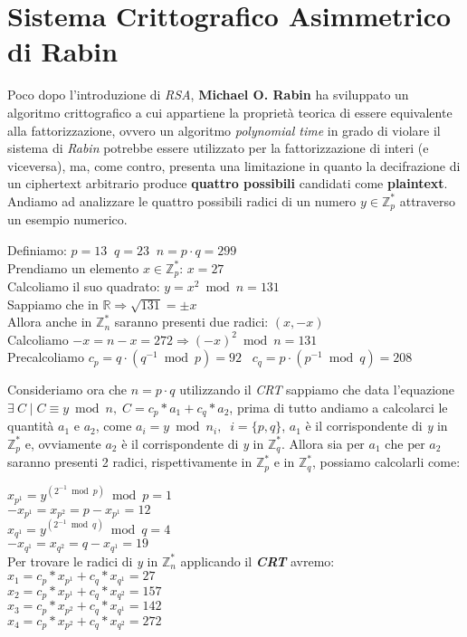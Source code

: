 \section{Sistema Crittografico Asimmetrico di Rabin}
Poco dopo l'introduzione di \textit{RSA}, \textbf{Michael O. Rabin} ha sviluppato un algoritmo crittografico a cui appartiene la proprietà teorica di essere equivalente alla fattorizzazione, ovvero un algoritmo \textit{polynomial time} in grado di violare il sistema di \textit{Rabin} potrebbe essere utilizzato per la fattorizzazione di interi (e viceversa), ma, come contro, presenta una limitazione in quanto la decifrazione di un ciphertext arbitrario produce \textbf{quattro possibili} candidati come \textbf{plaintext}. Andiamo ad analizzare le quattro possibili radici di un numero $y \in \mathbb{Z}_p^*$ attraverso un esempio numerico.
\begin{center}
    Definiamo: $p = 13 \;\; q = 23 \;\; n = p \cdot q = 299$ \\
    Prendiamo un elemento $x \in \mathbb{Z}_p^*$: $x = 27$ \\
    Calcoliamo il suo quadrato: $ y = x^2 \bmod n = 131$ \\  
    Sappiamo che in $\mathbb{R} \Rightarrow \sqrt{131} = \pm x$ \\
    Allora anche in $\mathbb{Z}_n^*$ saranno presenti due radici: $(x, -x)$ \\
    Calcoliamo $-x = n - x = 272 \Rightarrow (-x)^2 \bmod n = 131$ \\
    Precalcoliamo $c_p = q \cdot (q^{-1} \bmod p) = 92 \;\;\; c_q = p \cdot (p^{-1} \bmod q) = 208$
\end{center}
Consideriamo ora che $n = p \cdot q$ utilizzando il \textit{CRT} sappiamo che data l'equazione $\exists \: C \; | \; C \equiv y \bmod n, \; C = c_p * a_1 + c_q * a_2$, prima di tutto andiamo a calcolarci le quantità $a_1 \text{ e } a_2$, come $a_i = y \bmod n_i, \;\; i = \{p, q\}$, $a_1$ è il corrispondente di \textit{y} in $\mathbb{Z}_p^*$ e, ovviamente $a_2$ è il corrispondente di \textit{y} in $\mathbb{Z}_q^*$. Allora sia per $a_1 \text{ che per } a_2$ saranno presenti 2 radici, rispettivamente in $\mathbb{Z}_p^*$ e in $\mathbb{Z}_q^*$, possiamo calcolarli come:
\begin{center}
    $x_{p^1} = y^{(2^{-1} \bmod p)} \bmod p = 1$ \\
    $-x_{p^1} = x_{p^2} = p - x_{p^1} = 12$ \\
    $x_{q^1} = y^{(2^{-1} \bmod q)} \bmod q = 4$ \\
    $-x_{q^1} = x_{q^2} = q - x_{q^1} = 19$ \\
    Per trovare le radici di \textit{y} in $\mathbb{Z}_n^*$ applicando il \textbf{\textit{CRT}} avremo: \\
    $x_1 = c_p * x_{p^1} + c_q * x_{q^1} = 27$ \\
    $x_2 = c_p * x_{p^1} + c_q * x_{q^2} = 157$ \\
    $x_3 = c_p * x_{p^2} + c_q * x_{q^1} = 142$ \\
    $x_4 = c_p * x_{p^2} + c_q * x_{q^2} = 272$ \\
\end{center}

